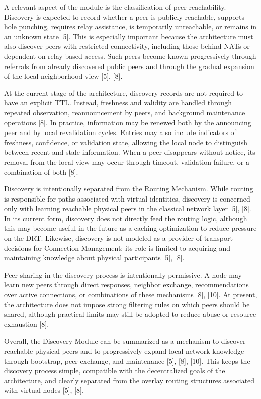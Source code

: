 \documentclass[12pt,a4paper]{article}
\begin{document}
A relevant aspect of the module is the classification of peer reachability. Discovery is expected to record whether a peer is publicly reachable, supports hole punching, requires relay assistance, is temporarily unreachable, or remains in an unknown state [5]. This is especially important because the architecture must also discover peers with restricted connectivity, including those behind NATs or dependent on relay-based access. Such peers become known progressively through referrals from already discovered public peers and through the gradual expansion of the local neighborhood view [5], [8].

At the current stage of the architecture, discovery records are not required to have an explicit TTL. Instead, freshness and validity are handled through repeated observation, reannouncement by peers, and background maintenance operations [8]. In practice, information may be renewed both by the announcing peer and by local revalidation cycles. Entries may also include indicators of freshness, confidence, or validation state, allowing the local node to distinguish between recent and stale information. When a peer disappears without notice, its removal from the local view may occur through timeout, validation failure, or a combination of both [8].

Discovery is intentionally separated from the Routing Mechanism. While routing is responsible for paths associated with virtual identities, discovery is concerned only with learning reachable physical peers in the classical network layer [5], [8]. In its current form, discovery does not directly feed the routing logic, although this may become useful in the future as a caching optimization to reduce pressure on the DRT. Likewise, discovery is not modeled as a provider of transport decisions for Connection Management; its role is limited to acquiring and maintaining knowledge about physical participants [5], [8].

Peer sharing in the discovery process is intentionally permissive. A node may learn new peers through direct responses, neighbor exchange, recommendations over active connections, or combinations of these mechanisms [8], [10]. At present, the architecture does not impose strong filtering rules on which peers should be shared, although practical limits may still be adopted to reduce abuse or resource exhaustion [8].

Overall, the Discovery Module can be summarized as a mechanism to discover reachable physical peers and to progressively expand local network knowledge through bootstrap, peer exchange, and maintenance [5], [8], [10]. This keeps the discovery process simple, compatible with the decentralized goals of the architecture, and clearly separated from the overlay routing structures associated with virtual nodes [5], [8]. 
\end{document}
